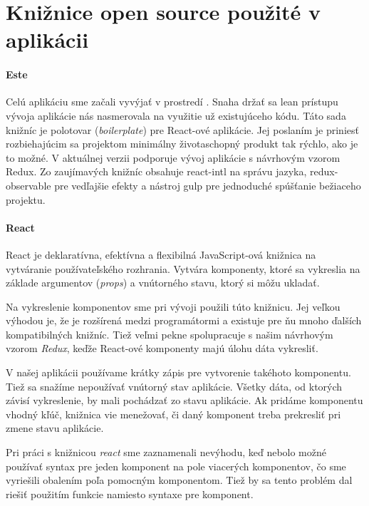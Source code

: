 \section{Knižnice open source použité v aplikácii}%

\label{sec:kniznice}

\paragraph{Este}
Celú aplikáciu sme začali vyvýjať v prostredí \cite[este]{Este}. Snaha držať sa lean prístupu vývoja aplikácie nás nasmerovala na využitie už existujúceho kódu. Táto sada knižníc je polotovar (\emph{boilerplate}) pre React-ové aplikácie. Jej poslaním je priniesť rozbiehajúcim sa projektom minimálny životaschopný produkt tak rýchlo, ako je to možné. V aktuálnej verzii podporuje vývoj aplikácie s návrhovým vzorom Redux. Zo zaujímavých knižníc obsahuje react-intl na správu jazyka, redux-observable pre vedľajšie efekty a nástroj gulp pre jednoduché spúšťanie bežiaceho projektu.

\paragraph{React}
React \cite{react} je deklaratívna, efektívna a flexibilná JavaScript-ová knižnica na vytváranie používateľského rozhrania. Vytvára komponenty, ktoré sa vykreslia na základe argumentov (\emph{props}) a vnútorného stavu, ktorý si môžu ukladať. 

Na vykreslenie komponentov sme pri vývoji použili túto knižnicu. Jej veľkou výhodou je, že je rozšírená medzi programátormi a existuje pre ňu mnoho ďalších kompatibilných knižníc. Tiež veľmi pekne spolupracuje s našim návrhovým vzorom \emph{Redux}, keďže React-ové komponenty majú úlohu dáta vykresliť.

V našej aplikácii používame krátky zápis pre vytvorenie takéhoto komponentu. Tiež sa snažíme nepoužívať vnútorný stav aplikácie. Všetky dáta, od ktorých závisí vykreslenie, by mali pochádzať zo stavu aplikácie. Ak pridáme komponentu vhodný kľúč, knižnica vie menežovať, či daný komponent treba prekresliť pri zmene stavu aplikácie.

Pri práci s knižnicou \emph{react} sme zaznamenali nevýhodu, keď nebolo možné používať syntax pre jeden komponent na pole viacerých komponentov, čo sme vyriešili obalením poľa pomocným komponentom. Tiež by sa tento problém dal riešiť použitím funkcie namiesto syntaxe pre komponent.

